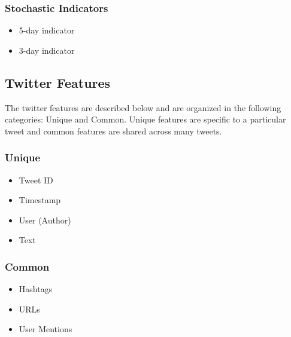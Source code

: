 \documentclass[journal]{IEEEtran}
\begin{document}
\subsubsection{Stochastic Indicators}

\begin{itemize}
	\item 5-day indicator
	\item 3-day indicator
\end{itemize}

\subsection{Twitter Features}

The twitter features are described below and are organized in the
 following categories: Unique and Common.
Unique features are specific to a particular tweet and
 common features are shared across many tweets.

\subsubsection{Unique}

\begin{itemize}
	\item Tweet ID
	\item Timestamp
	\item User (Author)
	\item Text
\end{itemize}

\subsubsection{Common}

\begin{itemize}
	\item Hashtags
	\item URLs
	\item User Mentions
\end{itemize}
\end{document}
